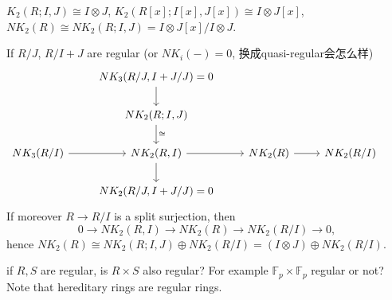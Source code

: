 $K_2(R;I,J)\cong I\otimes J$, $K_2(R[x];I[x],J[x])\cong I\otimes J[x]$, $NK_2(R)\cong NK_2(R;I,J)=I\otimes J[x]/I\otimes J$.

If $R/J$, $R/I+J$ are regular (or $NK_i(-)=0$, 换成quasi-regular会怎么样)
\[\begin{tikzcd}
	 & NK_3(R/J,I+J/J)=0 \ar[d] & & & \\
	 & NK_2(R;I,J) \ar[d,"\cong"] \\
NK_3(R/I)	\ar[r] & NK_2(R,I) \ar[r] \ar[d] & NK_2(R) \ar[r] &NK_2(R/I)\\
	& NK_2(R/J,I+J/J)=0 
\end{tikzcd}
\]
If moreover $R\longrightarrow R/I$ is a split surjection, then
\[0\longrightarrow NK_2(R,I)\longrightarrow NK_2(R)\longrightarrow NK_2(R/I)\longrightarrow 0,\]
hence $NK_2(R)\cong NK_2(R;I,J)\oplus NK_2(R/I)=(I\otimes J)\oplus NK_2(R/I)$.

{\color{red} if $R,S$ are regular, is $R\times S$ also regular? For example $\mathbb{F}_{p}\times \mathbb{F}_{p}$ regular or not? Note that hereditary rings are regular rings.}





















